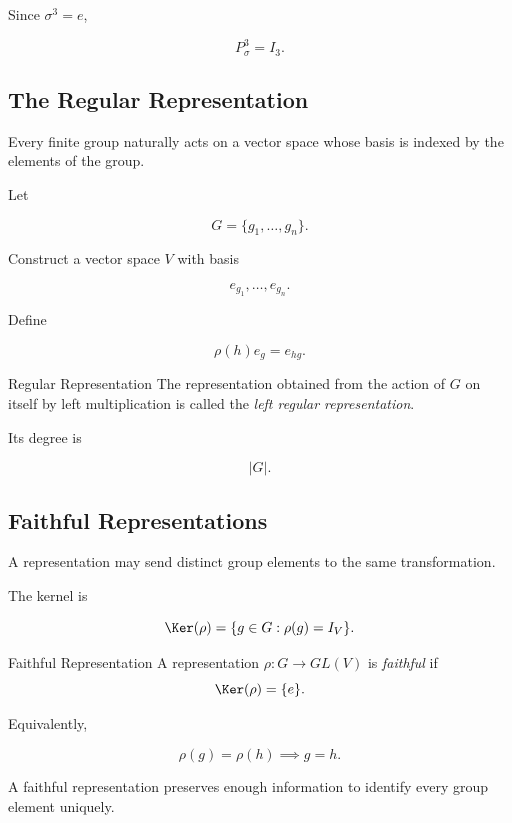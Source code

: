Since \(\sigma^3=e\),

\[ P_\sigma^3=I_3. \]

\subsection{The Regular Representation}
\label{subsec:regular-representation}

Every finite group naturally acts on a vector space whose basis is indexed
by the elements of the group.

Let

\[ G=\{g_1,\ldots,g_n\}. \]

Construct a vector space \(V\) with basis

\[ e_{g_1},\ldots,e_{g_n}. \]

Define

\[ \rho(h)e_g=e_{hg}. \]

\begin{definitionbox}{Regular Representation}
The representation obtained from the action of \(G\) on itself by left
multiplication is called the \emph{left regular representation}.
\end{definitionbox}

Its degree is

\[ |G|. \]

\subsection{Faithful Representations}
\label{subsec:faithful-representations}

A representation may send distinct group elements to the same
transformation.

The kernel is

\[ \Ker(\rho)=\{g\in G:\rho(g)=I_V\}. \]

\begin{definitionbox}{Faithful Representation}
A representation \(\rho:G\to GL(V)\) is \emph{faithful} if
\[ \Ker(\rho)=\{e\}. \]
\end{definitionbox}

Equivalently,

\[ \rho(g)=\rho(h)\implies g=h. \]

A faithful representation preserves enough information to identify every
group element uniquely.

